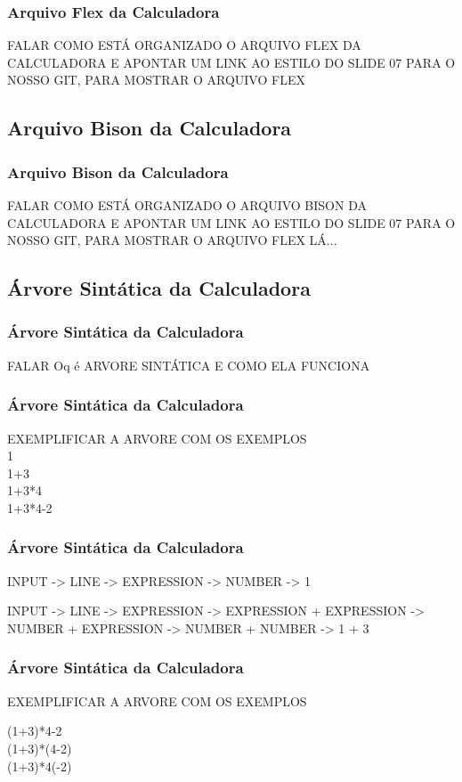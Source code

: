 \documentclass{beamer}
\begin{document}
\begin{frame}
\frametitle{Arquivo Flex da Calculadora}
FALAR COMO ESTÁ ORGANIZADO O ARQUIVO FLEX DA CALCULADORA E APONTAR UM LINK AO ESTILO DO SLIDE 07 PARA O NOSSO GIT, PARA MOSTRAR
O ARQUIVO FLEX


\end{frame}

\subsection{Arquivo Bison da Calculadora}

\begin{frame}
\frametitle{Arquivo Bison da Calculadora}
FALAR COMO ESTÁ ORGANIZADO O ARQUIVO BISON DA CALCULADORA E APONTAR UM LINK AO ESTILO DO SLIDE 07 PARA O NOSSO GIT, PARA MOSTRAR
O ARQUIVO FLEX LÁ...

\end{frame}

\subsection{Árvore Sintática da Calculadora }
\begin{frame}
\frametitle{Árvore Sintática da Calculadora }

FALAR Oq é ARVORE SINTÁTICA E COMO ELA FUNCIONA

\end{frame}

\begin{frame}
\frametitle{Árvore Sintática da Calculadora }

EXEMPLIFICAR A ARVORE COM OS EXEMPLOS 
\\ 1
\\ 1+3
\\ 1+3*4
\\ 1+3*4-2

\end{frame}

\begin {frame}
\frametitle{Árvore Sintática da Calculadora }

INPUT ->
  LINE ->
    EXPRESSION ->
      NUMBER ->
	1

INPUT ->
	LINE ->
		EXPRESSION ->
			      EXPRESSION + EXPRESSION ->
							  NUMBER + EXPRESSION ->
										  NUMBER + NUMBER ->
												      1 + 3

\end{frame}

\begin{frame}
\frametitle{Árvore Sintática da Calculadora }

EXEMPLIFICAR A ARVORE COM OS EXEMPLOS 

(1+3)*4-2 \\
(1+3)*(4-2) \\
 (1+3)*4(-2)


\end{frame}
\end{document}

